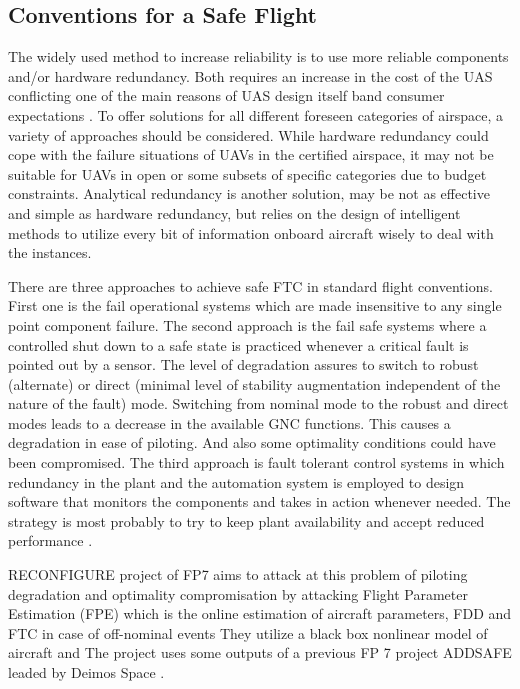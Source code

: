 \subsection{Conventions for a Safe Flight}\label{ch2:conventions}

The widely used method to increase reliability is to use more reliable components 
and/or hardware redundancy. Both requires an increase in the cost of the UAS 
conflicting one of the main reasons of UAS design itself band consumer expectations 
\cite{angelov2012sense}. To offer solutions for all different foreseen categories of 
airspace, a variety of approaches should be considered. While hardware redundancy 
could cope with the failure situations of UAVs in the certified airspace, it may not be 
suitable for UAVs in open or some subsets of specific categories due to budget 
constraints. Analytical redundancy is another solution, may be not as effective and 
simple as hardware redundancy, but relies on the design of intelligent methods to 
utilize every bit of information onboard aircraft wisely to deal with the instances.  

There are three approaches to achieve safe FTC in standard flight conventions. 
First one is the fail operational systems which are made insensitive to any single 
point component failure. The second approach is the fail safe systems where a 
controlled shut down to a safe state is practiced whenever a critical fault is pointed 
out by a sensor. The level of degradation assures to switch to robust (alternate) or 
direct (minimal level of stability augmentation independent of the nature of the fault) mode. 
Switching from nominal mode to the robust and direct modes leads to a decrease 
in the available GNC functions. This causes a degradation in ease of piloting. And 
also some optimality conditions could have been compromised. The third approach 
is fault tolerant control systems in which redundancy in the plant and the automation 
system is employed to design software that monitors the components and takes in 
action whenever needed. The strategy is most probably to try to keep plant availability 
and accept reduced performance \cite{blanke2000fault}.

RECONFIGURE project of FP7 \cite{goupil2015overview} aims to attack at this 
problem of piloting degradation and optimality compromisation by attacking 
Flight Parameter Estimation (FPE) which is the online estimation of aircraft parameters, 
FDD and FTC in case of off-nominal events \cite{RECONFIGURE} They utilize a black 
box nonlinear model of aircraft and The project uses some outputs of a previous FP 7 
project ADDSAFE leaded by Deimos Space \cite{ADDSAFE}.

